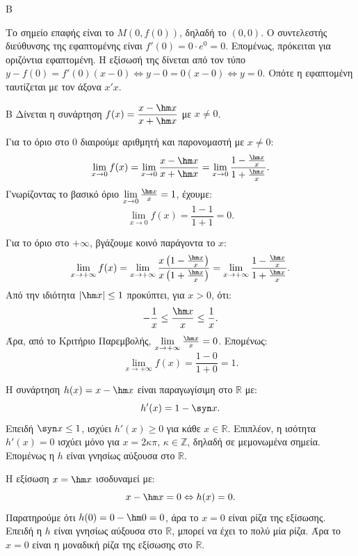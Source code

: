 \begin{thema}{Β}
\begin{erwthma}
\item Το σημείο επαφής είναι το $M(0, f(0))$, δηλαδή το $(0, 0)$.
Ο συντελεστής διεύθυνσης της εφαπτομένης είναι $f'(0) = 0 \cdot e^0 = 0$. Επομένως, πρόκειται για οριζόντια εφαπτομένη.
Η εξίσωσή της δίνεται από τον τύπο $y - f(0) = f'(0)(x-0) \Leftrightarrow y - 0 = 0(x-0) \Leftrightarrow y = 0$. 
Οπότε η εφαπτομένη ταυτίζεται με τον άξονα $x'x$.
\end{erwthma}
\end{thema}

\begin{thema}{Β}
Δίνεται η συνάρτηση $f(x) = \dfrac{x - \hm x}{x + \hm x}$ με $x\ne0$.
\begin{erwthma}
\item Για το όριο στο 0 διαιρούμε αριθμητή και παρονομαστή με $x \neq 0$:
\[ \lim_{x\to0} f(x) = \lim_{x\to0} \frac{x - \hm x}{x + \hm x} = \lim_{x\to0} \frac{1 - \frac{\hm x}{x}}{1 + \frac{\hm x}{x}}. \]
Γνωρίζοντας το βασικό όριο $\lim\limits_{x\to0} \frac{\hm x}{x} = 1$, έχουμε:
\[ \lim_{x\to0} f(x) = \frac{1 - 1}{1 + 1} = 0. \]

\item Για το όριο στο $+\infty$, βγάζουμε κοινό παράγοντα το $x$:
\[ \lim_{x\to+\infty} f(x) = \lim_{x\to+\infty} \frac{x\left(1 - \frac{\hm x}{x}\right)}{x\left(1 + \frac{\hm x}{x}\right)}
= \lim_{x\to+\infty} \frac{1 - \frac{\hm x}{x}}{1 + \frac{\hm x}{x}}. \]
Από την ιδιότητα $|\hm x| \le 1$ προκύπτει, για $x>0$, ότι:
\[ -\frac{1}{x} \le \frac{\hm x}{x} \le \frac{1}{x}. \]
Άρα, από το Κριτήριο Παρεμβολής, $\lim\limits_{x\to+\infty} \frac{\hm x}{x}=0$.
Επομένως:
\[ \lim_{x\to+\infty} f(x) = \frac{1 - 0}{1 + 0} = 1. \]

\item Η συνάρτηση $h(x) = x - \hm x$ είναι παραγωγίσιμη στο $\mathbb{R}$ με:
\[ h'(x) = 1 - \syn x. \]
Επειδή $\syn x \le 1$, ισχύει $h'(x)\ge0$ για κάθε $x\in\mathbb{R}$.
Επιπλέον, η ισότητα $h'(x)=0$ ισχύει μόνο για $x=2\kappa\pi$, $\kappa\in\mathbb{Z}$, δηλαδή σε μεμονωμένα σημεία. Επομένως η $h$ είναι γνησίως αύξουσα στο $\mathbb{R}$.

\item Η εξίσωση $x=\hm x$ ισοδυναμεί με:
\[ x-\hm x=0 \Leftrightarrow h(x)=0. \]
Παρατηρούμε ότι $h(0)=0-\hm0=0$, άρα το $x=0$ είναι ρίζα της εξίσωσης.
Επειδή η $h$ είναι γνησίως αύξουσα στο $\mathbb{R}$, μπορεί να έχει το πολύ μία ρίζα. Άρα το $x=0$ είναι η μοναδική ρίζα της εξίσωσης στο $\mathbb{R}$.
\end{erwthma}
\end{thema}

